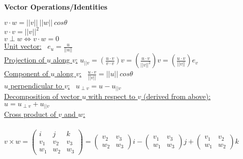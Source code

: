 \documentclass[10pt]{extarticle}
\begin{document}
\maketitle

\textbf{Vector Operations/Identities}

\noindent
$
v \cdot w = ||v|| \ ||w|| \ cos\theta
$\\
$
v \cdot v = ||v||^2
$\\
\noindent
$
v \perp w \Leftrightarrow v \cdot w = 0
$\\
\underline{Unit vector:} \ $e_u = \frac{u}{||u||}$\\
\underline{Projection of $u$ along $v$:}
$u_{||v} = \left(\frac{u\cdot v}{v \cdot v}\right) v = \left(\frac{u\cdot v}{||v||^2}\right)v = \left(\frac{u\cdot v}{||v||}\right)e_v$\\
\underline{Component of $u$ along $v$:} \ $\frac{u \cdot v}{||v||} = ||u|| \ cos\theta$\\	
\noindent
\underline{$u$ perpendicular to $v$:} \ $u_{\perp v} = u - u_{||v}$\\
\underline{Decomposition of vector $u$ with respect to $v$ (derived from above):} \ $u = u_{\perp v} + u_{||v}$\\

\noindent
\underline{Cross product of $v$ and $w$:}\\\\
$
v \times w = \begin{pmatrix}  i&j&k\\v_1&v_2&v_3\\w_1&w_2&w_3\end{pmatrix}
=  \begin{pmatrix}  v_2&v_3\\w_2&w_3 \end{pmatrix}i
-\begin{pmatrix}  v_1&v_3\\w_1&w_3 \end{pmatrix}j
+\begin{pmatrix}  v_1&v_2\\w_1&w_2 \end{pmatrix}k
$\\
\indent
\end{document}
